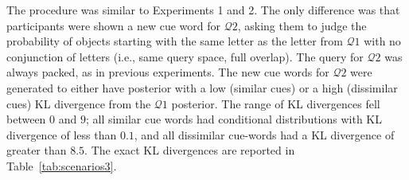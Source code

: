 The procedure was similar to Experiments 1 and 2. The only difference was that participants were shown a new cue word for $\mathcal{Q}2$, asking them to judge the probability of objects starting with the same letter as the letter from $\mathcal{Q}1$ with no conjunction of letters (i.e., same query space, full overlap). The query for $\mathcal{Q}2$ was always packed, as in previous experiments. The new cue words for $\mathcal{Q}2$ were generated to either have posterior with a low (similar cues) or a high (dissimilar cues) KL divergence from the $\mathcal{Q}1$ posterior. The range of KL divergences fell between $0$ and $9$; all similar cue words had conditional distributions with KL divergence of less than $0.1$, and all dissimilar cue-words had a KL divergence of greater than $8.5$. The exact KL divergences are reported in Table~\ref{tab:scenarios3}.
%
%
%
%
%
%
%
%
